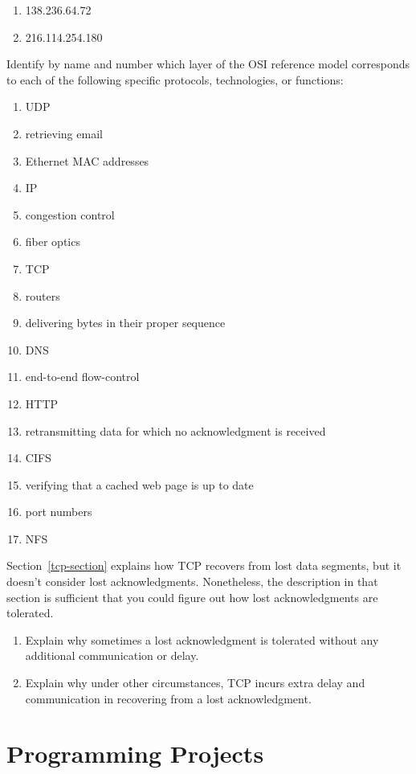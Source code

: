 \begin{chapterEnumerate}
\begin{enumerate}
\item
138.236.64.72
\item
216.114.254.180
\end{enumerate}
\item
Identify by name and number which layer of the OSI reference model corresponds to each
of the following specific protocols, technologies, or functions:
\begin{enumerate}
\item UDP
\item retrieving email
\item Ethernet MAC addresses
\item IP
\item congestion control
\item fiber optics
\item TCP
\item routers
\item delivering bytes in their proper sequence
\item DNS
\item end-to-end flow-control
\item HTTP
\item retransmitting data for which no acknowledgment is received
\item CIFS
\item verifying that a cached web page is up to date
\item port numbers
\item NFS
\end{enumerate}

\item
Section~\ref{tcp-section} explains how TCP recovers from lost data segments, but it doesn't consider lost acknowledgments.  Nonetheless, the description in that section is sufficient that you could figure out how lost acknowledgments are tolerated.
\begin{enumerate}
\item
Explain why sometimes a lost acknowledgment is tolerated without any additional communication or delay.
\item
Explain why under other circumstances, TCP incurs extra delay and communication in recovering from a lost acknowledgment.
\end{enumerate}

\end{chapterEnumerate}

\section*{Programming Projects}

